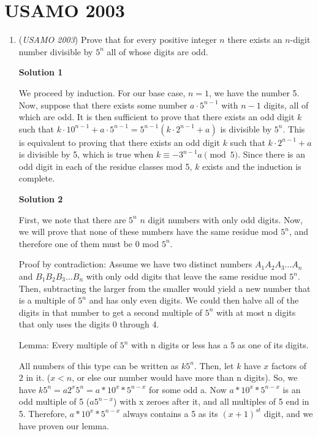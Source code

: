\section{USAMO 2003}
        \begin{enumerate}
        	\item (\textit{USAMO 2003}) Prove that for every positive integer $n$ there exists an $n$-digit number divisible by $5^n$ all of whose digits are odd.


 



\textbf{Solution 1}

We proceed by induction.  For our base case, $n=1$, we have the number 5.  Now, suppose that there exists some number $a \cdot 5^{n-1}$ with $n-1$ digits, all of which are odd.  It is then sufficient to prove that there exists an odd digit $k$ such that $k\cdot 10^{n-1} + a \cdot 5^{n-1} = 5^{n-1}(k \cdot 2^{n-1} + a)$ is divisible by $5^n$.  This is equivalent to proving that there exists an odd digit $k$ such that $k \cdot 2^{n-1} + a$ is divisible by 5, which is true when $k \equiv -3^{n-1}a \pmod{5}$.  Since there is an odd digit in each of the residue classes mod 5, $k$ exists and the induction is complete.

 



\textbf{Solution 2}

First, we note that there are $5^n$ $n$ digit numbers with only odd digits.  Now, we will prove that none of these numbers have the same residue mod $5^n$, and therefore one of them must be 0 mod $5^n$.

 
Proof by contradiction:  Assume we have two distinct numbers $A_1A_2A_3...A_n$ and $B_1B_2B_3...B_n$ with only odd digits that leave the same residue mod $5^n$.  Then, subtracting the larger from the smaller would yield a new number that is a multiple of $5^n$ and has only even digits.  We could then halve all of the digits in that number to get a second multiple of $5^n$ with at most n digits that only uses the digits 0 through 4.  

 
Lemma: Every multiple of $5^n$ with n digits or less has a 5 as one of its digits.  

 All numbers of this type can be written as $k5^n$.  Then, let $k$ have $x$ factors of $2$ in it.  ($x<n$, or else our number would have more than n digits).  So, we have $k5^n=a2^x5^n=a*10^x*5^{n-x}$ for some odd a.  Now $a*10^x*5^{n-x}$ is an odd multiple of 5  ($a5^{n-x}$)  with x zeroes after it, and all multiples of 5 end in 5.  Therefore, $a*10^x*5^{n-x}$ always contains a 5 as its $(x+1)^{st}$ digit, and we have proven our lemma.  


\end{enumerate}
